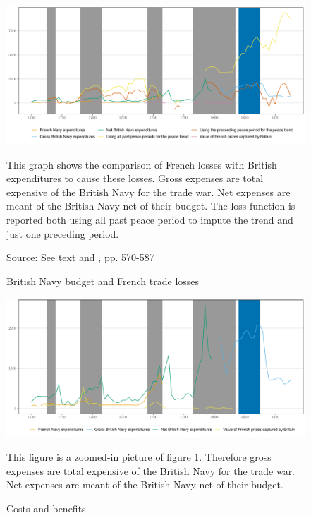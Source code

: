 \documentclass[12pt,a4paper,notitlepage,english]{article}
\newcommand{\fontsmall}{\fontsize{10pt}{12pt}\selectfont}
\newcommand{\source}[1]{\caption*{\footnotesize Source: {#1}} }
\begin{document}
\begin{appendix}
\begin{figure}[h!]
\caption{British Navy budget and French trade losses}
\label{Expenditures}
\centering
\includegraphics[scale=0.17]{Expenditures_Annual_Loss}
\begin{minipage}{18cm}
\begin{flushleft}
\fontsmall
This graph shows the comparison of French losses with British expenditures to cause these losses. Gross expenses are total expensive of the British Navy for the trade war. Net expenses are meant of the British Navy net of their budget. 
The loss function is reported both using all past peace period to impute the trend and just one preceding period. 
\end{flushleft}
\end{minipage}
\source{See text and \cite{mitchell1988}, pp. 570-587}
\end{figure}

\begin{figure}[h!]
\caption{Costs and benefits}
\label{Costs_and_benefits}
\centering
\includegraphics[scale=0.18]{Costs_and_benefits}
\begin{minipage}{18cm}
\begin{flushleft}
\fontsmall 
This figure is a zoomed-in picture of figure \ref{Expenditures}. Therefore gross expenses are total expensive of the British Navy for the trade war. Net expenses are meant of the British Navy net of their budget. 
\end{flushleft}
\end{minipage}
\end{figure}


\end{appendix}
\end{document}
